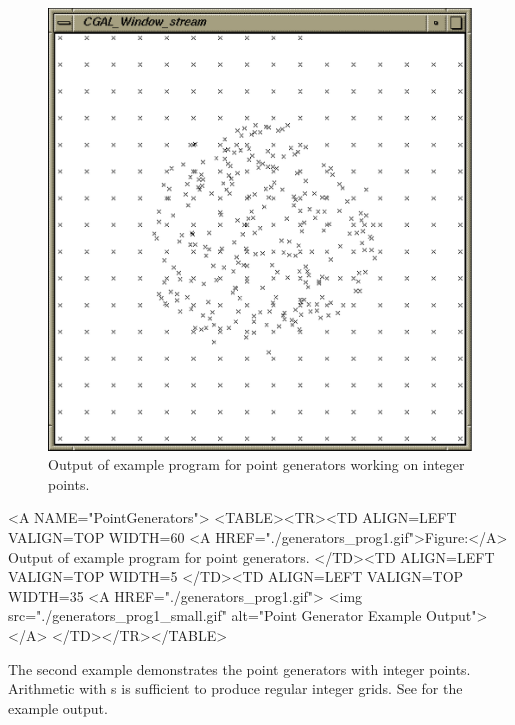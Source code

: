 \begin{ccTexOnly}
\begin{figure}
\begin{minipage}{0.45\textwidth}
      \includegraphics[width=\textwidth]{generators_prog2.ps}
      \caption{Output of example program for point generators working
        on integer points.}
      \label{figureIntegerPointGenerator}
    \end{minipage}%
  \end{figure}
\end{ccTexOnly}

\begin{ccHtmlOnly}
  <A NAME="PointGenerators">
  <TABLE><TR><TD ALIGN=LEFT VALIGN=TOP WIDTH=60%
    <A HREF="./generators_prog1.gif">Figure:</A>
    Output of example program for point generators.
  </TD><TD ALIGN=LEFT VALIGN=TOP WIDTH=5%
  </TD><TD ALIGN=LEFT VALIGN=TOP WIDTH=35%
    <A HREF="./generators_prog1.gif">
        <img src="./generators_prog1_small.gif" 
             alt="Point Generator Example Output"></A>
  </TD></TR></TABLE>
\end{ccHtmlOnly}


The second example demonstrates the point generators with integer
points. Arithmetic with s is sufficient to produce
regular integer grids. See 
for the example output.

